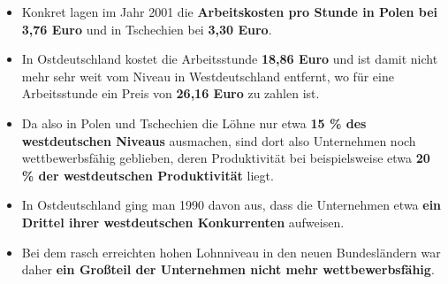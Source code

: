 {\begin{itemize}
    \item Konkret lagen im Jahr 2001 die \textbf{Arbeitskosten pro Stunde in Polen bei 3,76 Euro} und in Tschechien bei \textbf{3,30 Euro}.
    \item In Ostdeutschland kostet die Arbeitsstunde \textbf{18,86 Euro} und ist damit nicht mehr sehr weit vom Niveau in Westdeutschland entfernt, wo für eine Arbeitsstunde ein Preis von \textbf{26,16 Euro} zu zahlen ist.
    \item Da also in Polen und Tschechien die Löhne nur etwa \textbf{15 \% des westdeutschen Niveaus} ausmachen, sind dort also Unternehmen noch wettbewerbsfähig geblieben, deren Produktivität bei beispielsweise etwa \textbf{20 \% der westdeutschen Produktivität} liegt.
    \item In Ostdeutschland ging man 1990 davon aus, dass die Unternehmen etwa \textbf{ein Drittel ihrer westdeutschen Konkurrenten} aufweisen.
    \item Bei dem rasch erreichten hohen Lohnniveau in den neuen Bundesländern war daher \textbf{ein Großteil der Unternehmen nicht mehr wettbewerbsfähig}.
\end{itemize}
}


